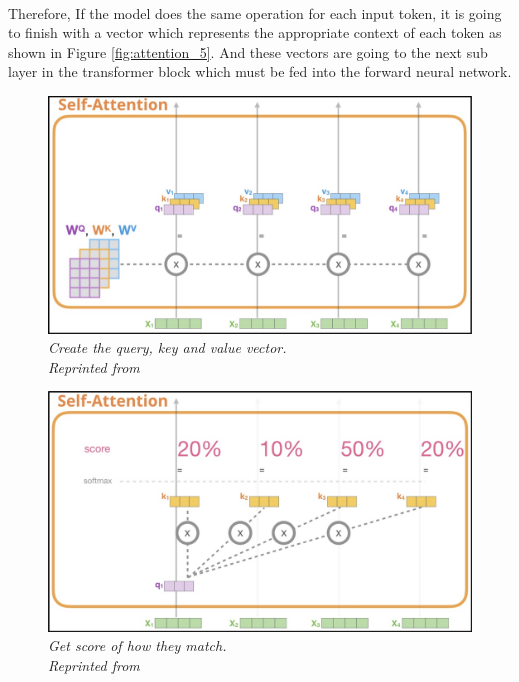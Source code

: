 \paragraph{}
Therefore, If the model does the same operation for each input token, it is going to finish with a vector which represents the appropriate context of each token as shown in Figure \ref{fig:attention_5}. And these vectors are going to the next sub layer in the transformer block which must be fed into the forward neural network.
\begin{figure}[H]
  \centering
  \caption[Create the query, key and value vector.]{\emph{Create the query, key and value vector. \\ 
  Reprinted from \citeauthor{alammar_2018} \citeyear{alammar_2018}}}\label{fig:attention_2}
  \includegraphics[scale = 0.3]{figures/attention_2.jpg}  
\end{figure}

\begin{figure}[H]
  \centering
  \caption[Get score of how they match.]{\emph{Get score of how they match. \\ 
  Reprinted from \citeauthor{alammar_2018} \citeyear{alammar_2018}}}\label{fig:attention_3}
  \includegraphics[scale = 0.3]{figures/attention_3.jpg}  
\end{figure}

